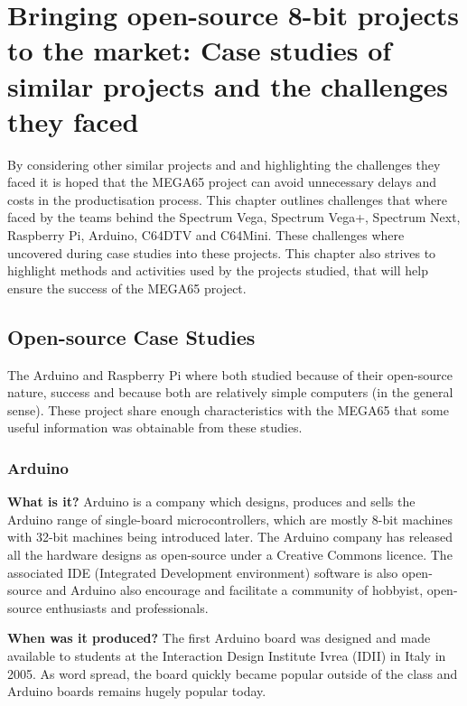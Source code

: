 
\chapter{Bringing open-source 8-bit projects to the market: Case studies of similar projects and the challenges they faced}
\label{Chapter3}
By considering other similar projects and and highlighting the challenges they faced it is hoped that the MEGA65 project can avoid unnecessary delays and costs in the productisation process. This chapter outlines challenges that where faced by the teams behind the Spectrum Vega, Spectrum Vega+, Spectrum Next, Raspberry Pi, Arduino, C64DTV and C64Mini. These challenges where uncovered during case studies into these projects. This chapter also strives to highlight methods and activities used by the projects studied, that will help ensure the success of the MEGA65 project. 

\section{Open-source Case Studies}
The Arduino and Raspberry Pi where both studied because of their open-source nature, success and because both are relatively simple computers (in the general sense). These project share enough characteristics with the MEGA65 that some useful information was obtainable from these studies.

\subsection{Arduino}
\textbf{What is it?}
Arduino is a company which designs, produces and sells the Arduino range of single-board microcontrollers, which are mostly 8-bit machines with 32-bit machines being introduced later. The Arduino company has released all the hardware designs as open-source under a Creative Commons licence. The associated IDE (Integrated Development environment) software is also open-source and Arduino also encourage and facilitate a community of hobbyist, open-source enthusiasts and professionals. 

\textbf{When was it produced?}
The first Arduino board was designed and made available to students at the Interaction Design Institute Ivrea (IDII) in Italy in 2005. As word spread, the board quickly became popular outside of the class and Arduino boards remains hugely popular today.

